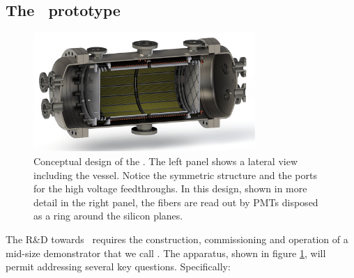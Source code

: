 \subsection{The \HDEMO\ prototype}

\begin{figure}
  \begin{center}
    \includegraphics[width=0.75\textwidth]{img2/nhd_vessel_render1.png}
    \caption{Conceptual design of the \HDEMO. The left panel shows a lateral view including the vessel. Notice the symmetric structure and the ports for
    the high voltage feedthroughs. In this design, shown in more detail in the right panel, the fibers are read out by PMTs disposed as a ring around the silicon planes.} 
    \label{fig.hdemo}
  \end{center}
\end{figure}




The R\&D towards \NHD\ requires the construction, commissioning and operation of a mid-size demonstrator that we call \HDEMO. The apparatus, shown in figure \ref{fig.hdemo}, will permit addressing several key questions. Specifically:



